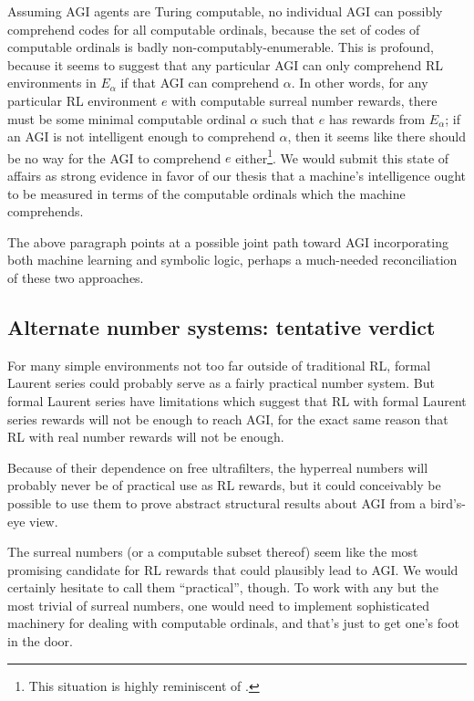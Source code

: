 \documentclass[reqno]{article}
\theoremstyle{definition}
\begin{document}
Assuming AGI agents are Turing computable,
no individual AGI can possibly comprehend codes for all computable ordinals, because
the set of codes of computable ordinals is badly non-computably-enumerable.
This is profound, because it seems to suggest that any particular AGI can
only comprehend RL environments in $E_\alpha$ if that AGI can comprehend $\alpha$.
In other words, for any particular RL environment $e$ with computable surreal number
rewards, there must be some minimal computable ordinal $\alpha$ such that $e$ has
rewards from $E_\alpha$; if an AGI is not intelligent enough to comprehend $\alpha$,
then it seems like there should be no way for the AGI to comprehend $e$
either\footnote{This situation is highly reminiscent of \cite{hibbard2011measuring}.}.
We would submit
this state of affairs as strong evidence in favor of our thesis
\cite{alexander2019measuring} that a machine's intelligence ought to be measured
in terms of the computable ordinals which the machine comprehends.

The above paragraph points at a possible joint path
toward AGI incorporating both machine learning and symbolic logic, perhaps
a much-needed reconciliation of these two approaches.

\subsection{Alternate number systems: tentative verdict}

For many simple environments not too far outside of traditional RL,
formal Laurent series could probably serve as a fairly practical number system.
But formal Laurent series have limitations which suggest that RL
with formal Laurent series rewards will not be enough to reach AGI, for the exact
same reason that RL with real number rewards will not be enough.

Because of their dependence on free ultrafilters, the hyperreal numbers will
probably never be of practical use as RL rewards, but it could conceivably be
possible to use them to prove abstract structural results about AGI from a
bird's-eye view.

The surreal numbers (or a computable subset thereof) seem like the most promising
candidate for RL rewards that could plausibly lead to AGI. We would certainly
hesitate to call them ``practical'', though. To work with any but the most trivial
of surreal numbers, one would need to implement sophisticated machinery for
dealing with computable ordinals, and that's just to get one's foot in the door.
\end{document}
